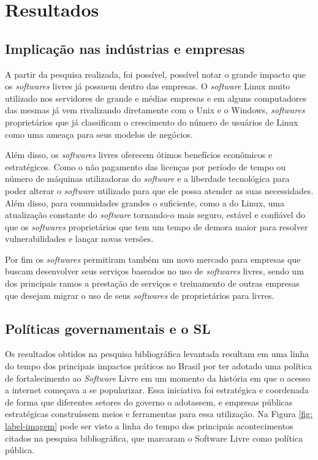 \documentclass[12pt]{article}
\begin{document}
\newpage

\section{Resultados}
\subsection{Implicação nas indústrias e empresas}

A partir da pesquisa realizada, foi possível, possível notar o grande impacto que os \textit{softwares} livres já possuem dentro das empresas. O \textit{software} Linux muito utilizado nos servidores de grande e médias empresas e em alguns computadores das mesmas já vem rivalizando diretamente com o Unix e o Windows, \textit{softwares} proprietários que já classificam o crescimento do número de usuários de Linux como uma ameaça para seus modelos de negócios.

Além disso, os \textit{softwares} livres oferecem ótimos benefícios econômicos e estratégicos. Como o não pagamento das licenças por período de tempo ou número de máquinas utilizadoras do \textit{software} e a liberdade tecnológica para poder alterar o \textit{software} utilizado para que ele possa atender as suas necessidades. Além disso, para comunidades grandes o suficiente, como a do Linux, uma atualização constante do \textit{software} tornando-o mais seguro, estável e confiável do que os \textit{softwares} proprietários que tem um tempo de demora maior para resolver vulnerabilidades e lançar novas versões.

Por fim os \textit{softwares} permitiram também um novo mercado para empresas que buscam desenvolver seus serviços baseados no uso de \textit{softwares} livres, sendo um dos principais ramos a prestação de serviços e treinamento de outras empresas que desejam migrar o uso de seus \textit{softwares} de proprietários para livres.

\subsection{Políticas governamentais e o SL}
Os resultados obtidos na pesquisa bibliográfica levantada resultam em uma linha do tempo dos principais impactos práticos no Brasil por ter adotado uma política de fortalecimento ao \textit{Software} Livre em um momento da história em que o acesso a internet começava a se popularizar. Essa iniciativa foi estratégica e coordenada de forma que diferentes setores do governo o adotassem, e empresas públicas estratégicas construíssem meios e ferramentas para essa utilização. Na Figura \ref{fig: label-imagem} pode ser visto a linha do tempo dos principais acontecimentos citados na pesquisa bibliográfica, que marcaram o Software Livre como política pública.
\end{document}
